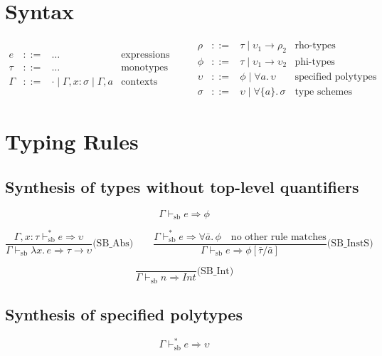 \documentclass{article}
\begin{document}
\section*{Syntax}

\[
\begin{array}{rcll}
e & ::= & \ldots & \text{expressions} \\
\tau & ::= & \ldots & \text{monotypes} \\
\Gamma & ::= & \cdot \mid \Gamma, x\!:\!\sigma \mid \Gamma, a & \text{contexts}
\end{array}
\qquad
\begin{array}{rcll}
\rho & ::= & \tau \mid \upsilon_1 \to \rho_2 & \text{rho-types} \\
\phi & ::= & \tau \mid \upsilon_1 \to \upsilon_2 & \text{phi-types} \\
\upsilon & ::= & \phi \mid \forall a.\, \upsilon & \text{specified polytypes} \\
\sigma & ::= & \upsilon \mid \forall\{a\}.\, \sigma & \text{type schemes}
\end{array}
\]

\section*{Typing Rules}

\subsection*{Synthesis of types without top-level quantifiers}

\[
\boxed{\Gamma \vdash_{\mathrm{sb}} e \Rightarrow \phi}
\]

\[
\frac{\Gamma, x\!:\!\tau \vdash_{\mathrm{sb}}^{*} e \Rightarrow \upsilon}{\Gamma \vdash_{\mathrm{sb}} \lambda x.\, e \Rightarrow \tau \to \upsilon}\text{(SB\_Abs)}
\qquad
\frac{\Gamma \vdash_{\mathrm{sb}}^{*} e \Rightarrow \forall \bar{a}.\, \phi \quad \text{no other rule matches}}{\Gamma \vdash_{\mathrm{sb}} e \Rightarrow \phi[\bar{\tau}/\bar{a}]}\text{(SB\_InstS)}
\]

\[
\frac{}{\Gamma \vdash_{\mathrm{sb}} n \Rightarrow \mathit{Int}}\text{(SB\_Int)}
\]

\subsection*{Synthesis of specified polytypes}

\[
\boxed{\Gamma \vdash_{\mathrm{sb}}^{*} e \Rightarrow \upsilon}
\]
\end{document}
